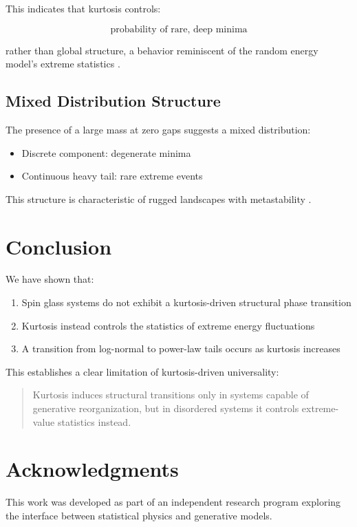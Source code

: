 \documentclass[11pt]{article}
\begin{document}
This indicates that kurtosis controls:

\[
\text{probability of rare, deep minima}
\]

rather than global structure, a behavior reminiscent of the random energy model's extreme statistics \citep{derrida1980random, derrida1981random}.

\subsection{Mixed Distribution Structure}

The presence of a large mass at zero gaps suggests a mixed distribution:

\begin{itemize}
\item Discrete component: degenerate minima
\item Continuous heavy tail: rare extreme events
\end{itemize}

This structure is characteristic of rugged landscapes with metastability \citep{biroli2000diversity, fyodorov2007replica}.

\section{Conclusion}

We have shown that:

\begin{enumerate}
\item Spin glass systems do not exhibit a kurtosis-driven structural phase transition
\item Kurtosis instead controls the statistics of extreme energy fluctuations
\item A transition from log-normal to power-law tails occurs as kurtosis increases
\end{enumerate}

This establishes a clear limitation of kurtosis-driven universality:

\begin{quote}
Kurtosis induces structural transitions only in systems capable of generative reorganization, but in disordered systems it controls extreme-value statistics instead.
\end{quote}

\section*{Acknowledgments}

This work was developed as part of an independent research program exploring the interface between statistical physics and generative models.



\end{document}
